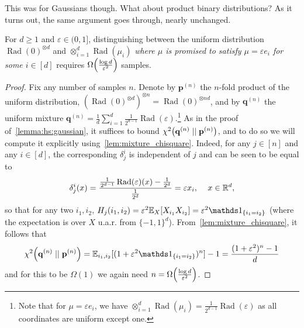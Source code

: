 \documentclass[10pt]{article}
\newcommand{\dst}{\varepsilon}
\newcommand{\ns}{n}
\newcommand{\dims}{d}
\newcommand{\p}{\mathbf{p}}
\newcommand{\q}{\mathbf{q}}
\begin{document}
This was for Gaussians though. What about product binary distributions? As it turns out, the same argument goes through, nearly unchanged.
\begin{lemma}
  \label{lemma:hs:bernoulli}
  For $\dims\geq 1$ and $\dst\in(0,1]$, distinguishing between the uniform distribution $\operatorname{Rad}(0)^{\otimes \dims}$ and $\otimes_{i=1}^\dims \operatorname{Rad}(\mu_i)$ \emph{where $\mu$ is promised to satisfy $\mu=\dst e_i$ for some $i\in[\dims]$} requires $\bigOmega{\frac{\log\dims}{\dst^2}}$ samples.
\end{lemma}
\begin{proof}
  Fix any number of samples $\ns$. Denote by $\p^{(\ns)}$ the $\ns$-fold product of the uniform distribution, $(\operatorname{Rad}(0)^{\otimes \dims})^{\otimes \ns} = \operatorname{Rad}(0)^{\otimes \ns\dims}$, and by $\q^{(\ns)}$ the uniform mixture $\q^{(\ns)} = \frac{1}{\dims}\sum_{i=1}^\dims \frac{1}{2^{\dims-1}}\operatorname{Rad}(\dst)$.\footnote{Note that for $\mu=\dst e_i$, we have $\otimes_{i=1}^\dims \operatorname{Rad}(\mu_i) = \frac{1}{2^{\dims-1}}\operatorname{Rad}(\dst)$ as all coordinates are uniform except one.}  As in the proof of~\autoref{lemma:hs:gaussian}, it suffices to bound $\chisquare{\q^{(\ns)}}{\p^{(\ns)}}$, and to do so we will compute it explicitly using~\autoref{lem:mixture_chisquare}. Indeed, for any $j\in[\ns]$ and any $i\in[\dims]$, the corresponding $\delta_j^i$ is independent of $j$ and can be seen to be equal to
  \[
      \delta_j^i(x) = \frac{\frac{1}{2^{\dims-1}}\operatorname{Rad}(\dst)(x)-\frac{1}{2^{\dims}}}{\frac{1}{2^{\dims}}} = \dst x_i,\,\quad x\in\R^\dims,
  \]
  so that for any two $i_1,i_2$, $H_j(i_1,i_2) = \dst^2\shortexpect_{X}[X_{i_1}X_{i_2} ] = \dst^2\indic{i_1=i_2}$ (where the expectation is over $X$ u.a.r. from $\{-1,1\}^\dims$).
  From~\autoref{lem:mixture_chisquare}, it follows that
  \[
      \chisquare{\q^{(\ns)}}{\p^{(\ns)}} = \shortexpect_{i_1,i_2}[ (1+\dst^2\indic{i_1=i_2})^\ns ] -1 
      = \frac{(1+\dst^2)^\ns-1}{\dims}
  \]
  and for this to be $\Omega(1)$ we again need $\ns = \bigOmega{\frac{\log\dims}{\dst^2}}$.
\end{proof}
\end{document}
